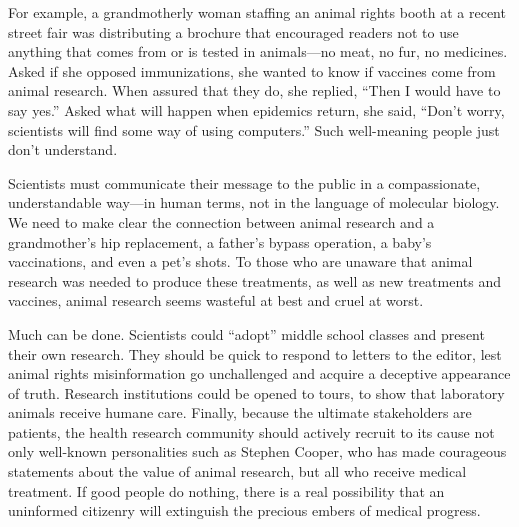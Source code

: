 For example, a grandmotherly woman staffing an animal rights booth at a
recent street fair was distributing a brochure that encouraged readers
not to use anything that comes from or is tested in animals---no meat,
no fur, no medicines. Asked if she opposed immunizations, she wanted to
know if vaccines come from animal research. When assured that they do,
she replied, ``Then I would have to say yes.'' Asked what will happen
when epidemics return, she said, ``Don't worry, scientists will find
some way of using computers.'' Such well-meaning people just don't
understand.

Scientists must communicate their message to the public in a
compassionate, understandable way---in human terms, not in the language
of molecular biology. We need to make clear the connection between
animal research and a grandmother's hip replacement, a father's bypass
operation, a baby's vaccinations, and even a pet's shots. To those who
are unaware that animal research was needed to produce these treatments,
as well as new treatments and vaccines, animal research seems wasteful
at best and cruel at worst.

Much can be done. Scientists could ``adopt'' middle school classes and
present their own research. They should be quick to respond to letters
to the editor, lest animal rights misinformation go unchallenged and
acquire a deceptive appearance of truth. Research institutions could be
opened to tours, to show that laboratory animals receive humane care.
Finally, because the ultimate stakeholders are patients, the health
research community should actively recruit to its cause not only
well-known personalities such as Stephen Cooper, who has made courageous
statements about the value of animal research, but all who receive
medical treatment. If good people do nothing, there is a real
possibility that an uninformed citizenry will extinguish the precious
embers of medical progress.


